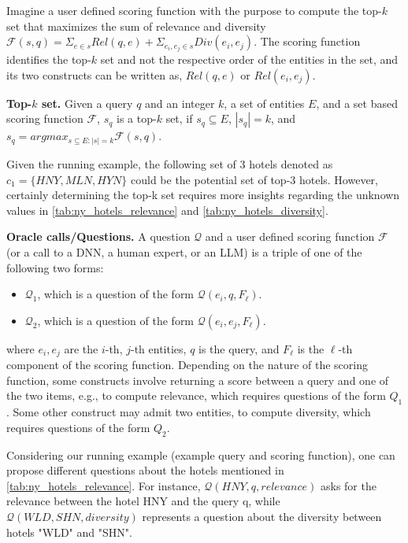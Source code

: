 Imagine a user defined scoring function with the purpose to compute the top-$k$ set that maximizes the sum of relevance and diversity $\mathcal{F}(s, q)= \Sigma_{e \in s} Rel(q,e)+ \Sigma_{e_i,e_j \in s} Div(e_i,e_j)$. The scoring function identifies the top-$k$ set and not the respective order of the entities in the set, and its two constructs can be written as, $Rel(q, e)$ or $Rel(e_i, e_j)$.

\textbf{Top-$k$ set.} Given  a query  $q$ and an integer $k$, a set of entities $E$, and a set based scoring function $\mathcal{F}$, $s_q$ is a top-$k$ set, if $s_q \subseteq E$, $|s_q|=k$, and 
$s_q = argmax_{s \subseteq E: |s|=k} \mathcal{F}(s, q)$.

Given the running example, the following set of 3 hotels denoted as 
 $c_1 = \{ HNY, MLN, HYN \}$ could be the potential set of top-$3$ hotels. However, certainly determining the top-k set requires more insights regarding the unknown values in \autoref{tab:ny_hotels_relevance} and \autoref{tab:ny_hotels_diversity}.
   

\textbf{Oracle calls/Questions.} A question $\mathcal{Q}$ and a user defined scoring function $\mathcal{F}$ (or a call to a DNN, a human expert, or an LLM) is a triple of one of the following two forms: 
\begin{itemize}
    \item $\mathcal{Q}_1$, which is a question of the form $\mathcal{Q}(e_i, q, F_{\ell})$.
    \item $\mathcal{Q}_2$, which is a question of the form $\mathcal{Q}(e_i, e_j, F_{\ell})$.
\end{itemize}
   where $e_i,e_j$ are the $i$-th, $j$-th entities, $q$ is the query, and $F_{\ell}$ is the $\ell$-th component of the scoring function. Depending on the nature of the scoring function, some constructs involve returning a score between a query and one of the two items, e.g., to compute relevance, which requires questions of the form $Q_1$. Some other construct may admit two entities, to compute diversity, which requires questions of the form $Q_2$.

Considering our running example (example query and scoring function), one can propose different questions about the hotels mentioned in \autoref{tab:ny_hotels_relevance}. For instance, $\mathcal{Q}(HNY, q, relevance)$ asks for the relevance between the hotel HNY and the query q, while $\mathcal{Q}(WLD, SHN, diversity)$ represents a question about the diversity between hotels "WLD" and "SHN".

